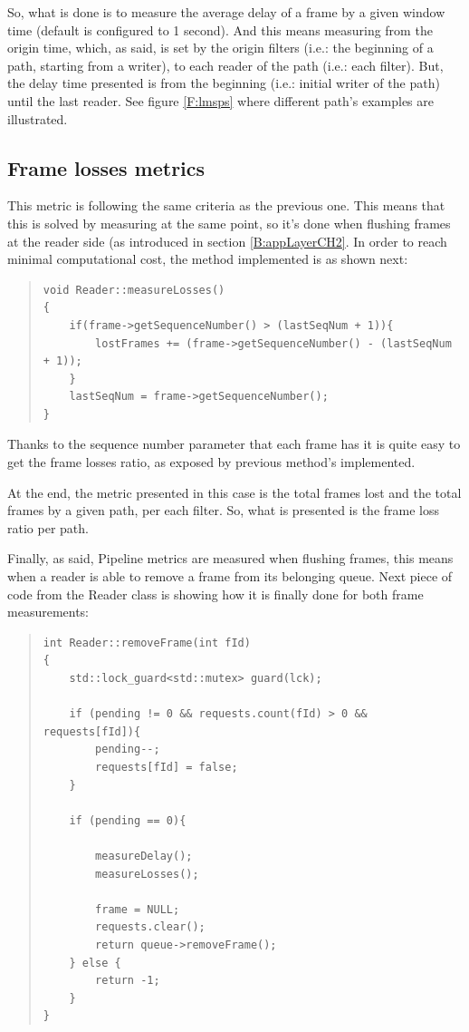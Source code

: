 So, what is done is to measure the average delay of a frame by a given window time (default is configured to 1 second). And this means measuring from the origin time, which, as said, is set by the origin filters (i.e.: the beginning of a path, starting from a writer), to each reader of the path (i.e.: each filter). But, the delay time presented is from the beginning (i.e.: initial writer of the path) until the last reader. See figure \ref{F:lmsps} where different path's examples are illustrated.

\subsection{Frame losses metrics}

This metric is following the same criteria as the previous one. This means that this is solved by measuring at the same point, so it's done when flushing frames at the reader side (as introduced in section \ref{B:appLayerCH2}. In order to reach minimal computational cost, the method implemented is as shown next:

\begin{quote}
\begin{verbatim}
void Reader::measureLosses()
{
    if(frame->getSequenceNumber() > (lastSeqNum + 1)){
        lostFrames += (frame->getSequenceNumber() - (lastSeqNum + 1));
    }
    lastSeqNum = frame->getSequenceNumber();
}
\end{verbatim}
\end{quote} 

Thanks to the sequence number parameter that each frame has it is quite easy to get the frame losses ratio, as exposed by previous method's implemented.

At the end, the metric presented in this case is the total frames lost and the total frames by a given path, per each filter. So, what is presented is the frame loss ratio per path.

Finally, as said, Pipeline metrics are measured when flushing frames, this means when a reader is able to remove a frame from its belonging queue. Next piece of code from the Reader class is showing how it is finally done for both frame measurements:

\begin{quote}
\begin{verbatim}
int Reader::removeFrame(int fId)
{
    std::lock_guard<std::mutex> guard(lck);

    if (pending != 0 && requests.count(fId) > 0 && requests[fId]){
        pending--;
        requests[fId] = false;
    }
    
    if (pending == 0){

        measureDelay();
        measureLosses();

        frame = NULL;
        requests.clear();
        return queue->removeFrame();
    } else {
        return -1;
    }
}
\end{verbatim}
\end{quote}

